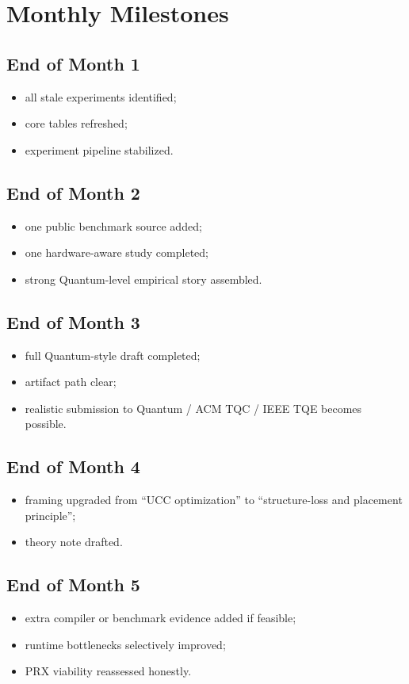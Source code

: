 \documentclass[11pt]{article}
\begin{document}
\section{Monthly Milestones}

\subsection*{End of Month 1}
\begin{itemize}
    \item all stale experiments identified;
    \item core tables refreshed;
    \item experiment pipeline stabilized.
\end{itemize}

\subsection*{End of Month 2}
\begin{itemize}
    \item one public benchmark source added;
    \item one hardware-aware study completed;
    \item strong Quantum-level empirical story assembled.
\end{itemize}

\subsection*{End of Month 3}
\begin{itemize}
    \item full Quantum-style draft completed;
    \item artifact path clear;
    \item realistic submission to Quantum / ACM TQC / IEEE TQE becomes possible.
\end{itemize}

\subsection*{End of Month 4}
\begin{itemize}
    \item framing upgraded from ``UCC optimization'' to ``structure-loss and placement principle'';
    \item theory note drafted.
\end{itemize}

\subsection*{End of Month 5}
\begin{itemize}
    \item extra compiler or benchmark evidence added if feasible;
    \item runtime bottlenecks selectively improved;
    \item PRX viability reassessed honestly.
\end{itemize}
\end{document}
